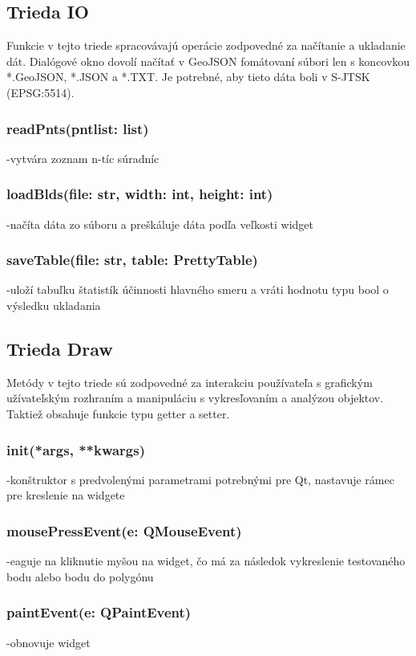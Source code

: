 \documentclass[12pt]{article}
\begin{document}
\subsection*{Trieda IO}
Funkcie v tejto triede spracovávajú operácie zodpovedné za načítanie a ukladanie dát. Dialógové okno dovolí načítať v GeoJSON fomátovaní súbori len s koncovkou *.GeoJSON, *.JSON a *.TXT. Je potrebné, aby tieto dáta boli v S-JTSK (EPSG:5514). 
\subsubsection*{readPnts(pnt\textunderscore list: list)}
\noindent-vytvára zoznam n-tíc súradníc
\subsubsection*{loadBlds(file: str, width: int, height: int)}
\noindent-načíta dáta zo súboru a preškáluje dáta podľa veľkosti widget
\subsubsection*{saveTable(file: str, table: PrettyTable)}
\noindent-uloží tabuľku štatistík účinnosti hlavného smeru a vráti hodnotu typu bool o výsledku ukladania
\subsection*{Trieda Draw}
Metódy v tejto triede sú zodpovedné za interakciu používateľa s grafickým užívateľským rozhraním a manipuláciu s vykresľovaním a analýzou objektov. Taktiež obsahuje funkcie typu getter a setter.
\subsubsection*{\textunderscore \textunderscore init\textunderscore \textunderscore(*args, **kwargs)}
\noindent-konštruktor s predvolenými parametrami potrebnými pre Qt, nastavuje rámec pre kreslenie na widgete
\subsubsection*{mousePressEvent(e: QMouseEvent)}
\noindent-eaguje na kliknutie myšou na widget, čo má za následok vykreslenie testovaného bodu alebo bodu do polygónu
\subsubsection*{paintEvent(e: QPaintEvent)}
\noindent-obnovuje widget
\end{document}

